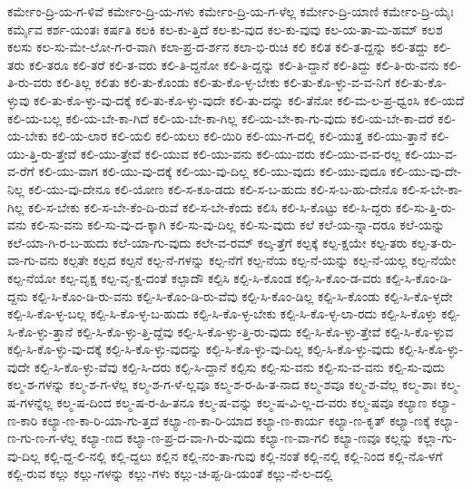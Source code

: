 {ಕರ್ಮೇಂ-ದ್ರಿ-ಯ-ಗ-ಳಿವೆ
ಕರ್ಮೇಂ-ದ್ರಿ-ಯ-ಗಳು
ಕರ್ಮೇಂ-ದ್ರಿ-ಯ-ಗ-ಳೆಲ್ಲ
ಕರ್ಮೇಂ-ದ್ರಿ-ಯಾಣಿ
ಕರ್ಮೇಂ-ದ್ರಿ-ಯೈಃ
ಕರ್ಮೈವ
ಕರ್ಶ-ಯಂತಃ
ಕರ್ಷತಿ
ಕಲಕಿ
ಕಲ-ಕು-ತ್ತಿದೆ
ಕಲ-ಕು-ವುದ
ಕಲ-ಕು-ವುವು
ಕಲ-ಯ-ತಾ-ಮ-ಹಮ್
ಕಲಶ
ಕಲಸು
ಕಲ-ಸು-ಮೇ-ಲೋ-ಗ-ರ-ವಾಗಿ
ಕಲಾ-ಪ್ರ-ದ-ರ್ಶನ
ಕಲಾ-ಭಿ-ರುಚಿ
ಕಲಿ
ಕಲಿತ
ಕಲಿ-ತ-ದ್ದನ್ನು
ಕಲಿ-ತದ್ದು
ಕಲಿ-ತರು
ಕಲಿ-ತರೂ
ಕಲಿ-ತರೆ
ಕಲಿ-ತ-ವರು
ಕಲಿ-ತಿ-ದ್ದನೋ
ಕಲಿ-ತಿ-ದ್ದನ್ನು
ಕಲಿ-ತಿ-ದ್ದಾನೆ
ಕಲಿ-ತಿದ್ದು
ಕಲಿ-ತಿ-ರು-ವನು
ಕಲಿ-ತಿ-ರು-ವರು
ಕಲಿ-ತಿಲ್ಲ
ಕಲಿತು
ಕಲಿ-ತು-ಕೊಂಡು
ಕಲಿ-ತು-ಕೊ-ಳ್ಳ-ಬೇಕು
ಕಲಿ-ತು-ಕೊ-ಳ್ಳು-ವ-ವ-ನಿಗೆ
ಕಲಿ-ತು-ಕೊ-ಳ್ಳುವು
ಕಲಿ-ತು-ಕೊ-ಳ್ಳು-ವು-ದಕ್ಕೆ
ಕಲಿ-ತು-ಕೊ-ಳ್ಳು-ವುದೇ
ಕಲಿ-ತು-ದನ್ನು
ಕಲಿ-ತೆನೋ
ಕಲಿ-ಮ-ಲ-ಪ್ರ-ಧ್ವಂಸಿ
ಕಲಿ-ಯದೆ
ಕಲಿ-ಯ-ಬಲ್ಲ
ಕಲಿ-ಯ-ಬೇ-ಕಾ-ಗಿದೆ
ಕಲಿ-ಯ-ಬೇ-ಕಾ-ಗಿಲ್ಲ
ಕಲಿ-ಯ-ಬೇ-ಕಾ-ಗು-ವುದು
ಕಲಿ-ಯ-ಬೇ-ಕಾ-ದರೆ
ಕಲಿ-ಯ-ಬೇಕು
ಕಲಿ-ಯ-ಲಾರ
ಕಲಿ-ಯಲಿ
ಕಲಿ-ಯಲು
ಕಲಿ-ಯಿರಿ
ಕಲಿ-ಯು-ಗ-ದಲ್ಲಿ
ಕಲಿ-ಯುತ್ತ
ಕಲಿ-ಯು-ತ್ತಾನೆ
ಕಲಿ-ಯು-ತ್ತಿ-ರು-ತ್ತೇವೆ
ಕಲಿ-ಯು-ತ್ತೇವೆ
ಕಲಿ-ಯುವ
ಕಲಿ-ಯು-ವನು
ಕಲಿ-ಯು-ವರು
ಕಲಿ-ಯು-ವ-ವ-ರಲ್ಲ
ಕಲಿ-ಯು-ವ-ವ-ರೆಗೆ
ಕಲಿ-ಯು-ವಾಗ
ಕಲಿ-ಯು-ವು-ದಕ್ಕೆ
ಕಲಿ-ಯು-ವು-ದಿಲ್ಲ
ಕಲಿ-ಯು-ವುದು
ಕಲಿ-ಯು-ವುದೂ
ಕಲಿ-ಯು-ವು-ದೇ-ನಿಲ್ಲ
ಕಲಿ-ಯು-ವು-ದೇನೂ
ಕಲಿ-ಯೋಣ
ಕಲಿ-ಸ-ಕೂ-ಡದು
ಕಲಿ-ಸ-ಬ-ಹುದು
ಕಲಿ-ಸ-ಬ-ಹು-ದೇನೊ
ಕಲಿ-ಸ-ಬೇ-ಕಾ-ಗಿಲ್ಲ
ಕಲಿ-ಸ-ಬೇಕು
ಕಲಿ-ಸ-ಬೇ-ಕೆಂ-ದಿ-ರುವೆ
ಕಲಿ-ಸ-ಬೇ-ಕೆಂದು
ಕಲಿಸಿ
ಕಲಿ-ಸಿ-ಕೊಟ್ಟು
ಕಲಿ-ಸಿ-ದ್ದರು
ಕಲಿ-ಸು-ತ್ತಿ-ರು-ವನು
ಕಲಿ-ಸು-ವನು
ಕಲಿ-ಸು-ವು-ದ-ಕ್ಕಾಗಿ
ಕಲಿ-ಸು-ವು-ದಿಲ್ಲ
ಕಲಿ-ಸು-ವುದು
ಕಲೆ
ಕಲೆ-ಯ-ನ್ನಾ-ದರೂ
ಕಲೆ-ಯನ್ನು
ಕಲೆ-ಯಾ-ಗಿ-ರ-ಬ-ಹುದು
ಕಲೆ-ಯಾ-ಗು-ವುದು
ಕಲೇ-ವ-ರಮ್
ಕಲ್ಕ-ತ್ತೆಗೆ
ಕಲ್ಪಕ್ಕೆ
ಕಲ್ಪ-ಕ್ಷಯೇ
ಕಲ್ಪ-ತರು
ಕಲ್ಪ-ತ-ರು-ವಾ-ಗು-ವನು
ಕಲ್ಪತೇ
ಕಲ್ಪದ
ಕಲ್ಪನೆ
ಕಲ್ಪ-ನೆ-ಗಳನ್ನು
ಕಲ್ಪ-ನೆಗೆ
ಕಲ್ಪ-ನೆಯ
ಕಲ್ಪ-ನೆ-ಯನ್ನು
ಕಲ್ಪ-ನೆ-ಯಲ್ಲ
ಕಲ್ಪ-ನೆಯೇ
ಕಲ್ಪ-ನೆಯೋ
ಕಲ್ಪ-ವೃಕ್ಷ
ಕಲ್ಪ-ವೃ-ಕ್ಷ-ದಂತೆ
ಕಲ್ಪಾದೌ
ಕಲ್ಪಿಸಿ
ಕಲ್ಪಿ-ಸಿ-ಕೊಂಡ
ಕಲ್ಪಿ-ಸಿ-ಕೊಂ-ಡ-ವರು
ಕಲ್ಪಿ-ಸಿ-ಕೊಂ-ಡಿ-ದ್ದನು
ಕಲ್ಪಿ-ಸಿ-ಕೊಂ-ಡಿ-ರು-ವನು
ಕಲ್ಪಿ-ಸಿ-ಕೊಂ-ಡಿ-ರು-ವೆವು
ಕಲ್ಪಿ-ಸಿ-ಕೊಂ-ಡಿಲ್ಲ
ಕಲ್ಪಿ-ಸಿ-ಕೊಂಡು
ಕಲ್ಪಿ-ಸಿ-ಕೊ-ಳ್ಳದೇ
ಕಲ್ಪಿ-ಸಿ-ಕೊ-ಳ್ಳ-ಬಲ್ಲ
ಕಲ್ಪಿ-ಸಿ-ಕೊ-ಳ್ಳ-ಬ-ಹುದು
ಕಲ್ಪಿ-ಸಿ-ಕೊ-ಳ್ಳ-ಬೇಕು
ಕಲ್ಪಿ-ಸಿ-ಕೊ-ಳ್ಳ-ಲಾ-ರದು
ಕಲ್ಪಿ-ಸಿ-ಕೊಳ್ಳು
ಕಲ್ಪಿ-ಸಿ-ಕೊ-ಳ್ಳು-ತ್ತಾನೆ
ಕಲ್ಪಿ-ಸಿ-ಕೊ-ಳ್ಳು-ತ್ತಿ-ದ್ದೆವು
ಕಲ್ಪಿ-ಸಿ-ಕೊ-ಳ್ಳು-ತ್ತಿ-ರು-ವುದು
ಕಲ್ಪಿ-ಸಿ-ಕೊ-ಳ್ಳು-ತ್ತೇವೆ
ಕಲ್ಪಿ-ಸಿ-ಕೊ-ಳ್ಳುವ
ಕಲ್ಪಿ-ಸಿ-ಕೊ-ಳ್ಳು-ವು-ದಕ್ಕೆ
ಕಲ್ಪಿ-ಸಿ-ಕೊ-ಳ್ಳು-ವುದನ್ನು
ಕಲ್ಪಿ-ಸಿ-ಕೊ-ಳ್ಳು-ವು-ದಿಲ್ಲ
ಕಲ್ಪಿ-ಸಿ-ಕೊ-ಳ್ಳು-ವುದು
ಕಲ್ಪಿ-ಸಿ-ಕೊ-ಳ್ಳು-ವುದೇ
ಕಲ್ಪಿ-ಸಿ-ಕೊ-ಳ್ಳು-ವೆವು
ಕಲ್ಪಿ-ಸಿ-ದರು
ಕಲ್ಪಿ-ಸಿ-ದ್ದಾನೆ
ಕಲ್ಪಿಸು
ಕಲ್ಪಿ-ಸು-ವನು
ಕಲ್ಪಿ-ಸು-ವ-ವನು
ಕಲ್ಪಿ-ಸು-ವುದು
ಕಲ್ಮ-ಶ-ಗಳನ್ನು
ಕಲ್ಮ-ಶ-ಗ-ಳೆಲ್ಲ
ಕಲ್ಮ-ಶ-ಗ-ಳೆ-ಲ್ಲವೂ
ಕಲ್ಮ-ಶ-ರ-ಹಿ-ತ-ನಾದ
ಕಲ್ಮ-ಶವೂ
ಕಲ್ಮ-ಶ-ವೆಲ್ಲ
ಕಲ್ಮ-ಶಾಃ
ಕಲ್ಮ-ಷ-ಗಳನ್ನೆಲ್ಲ
ಕಲ್ಮ-ಷ-ದಿಂದ
ಕಲ್ಮ-ಷ-ರ-ಹಿ-ತನೂ
ಕಲ್ಮ-ಷ-ವನ್ನು
ಕಲ್ಮ-ಷ-ವಿ-ಲ್ಲ-ದ-ವರು
ಕಲ್ಮ-ಷವೂ
ಕಲ್ಯಾಣ
ಕಲ್ಯಾ-ಣ-ಕಾರಿ
ಕಲ್ಯಾ-ಣ-ಕಾ-ರಿ-ಯಾ-ಗು-ತ್ತದೆ
ಕಲ್ಯಾ-ಣ-ಕಾ-ರಿ-ಯಾದ
ಕಲ್ಯಾ-ಣ-ಕಾರ್ಯ
ಕಲ್ಯಾ-ಣ-ಕೃತ್
ಕಲ್ಯಾ-ಣಕ್ಕೆ
ಕಲ್ಯಾ-ಣ-ಗು-ಣ-ಗ-ಳೆಲ್ಲ
ಕಲ್ಯಾ-ಣದ
ಕಲ್ಯಾ-ಣ-ಪ್ರ-ದ-ವಾ-ಗಿ-ರು-ವುದು
ಕಲ್ಯಾ-ಣ-ವಾ-ಗಲಿ
ಕಲ್ಯಾ-ಣವೂ
ಕಲ್ಲನ್ನು
ಕಲ್ಲಾ-ಗು-ವು-ದಿಲ್ಲ
ಕಲ್ಲಿ-ದ್ದ-ಲಿ-ನಲ್ಲಿ
ಕಲ್ಲಿ-ದ್ದಲು
ಕಲ್ಲಿನ
ಕಲ್ಲಿ-ನಂ-ತಾ-ಗುವು
ಕಲ್ಲಿ-ನಂತೆ
ಕಲ್ಲಿ-ನಲ್ಲಿ
ಕಲ್ಲಿ-ನಿಂದ
ಕಲ್ಲಿ-ನೊ-ಳಗೆ
ಕಲ್ಲಿ-ರುವ
ಕಲ್ಲು
ಕಲ್ಲು-ಗಳನ್ನು
ಕಲ್ಲು-ಗಳು
ಕಲ್ಲು-ಚ-ಪ್ಪ-ಡಿ-ಯಂತೆ
ಕಲ್ಲು-ನೆ-ಲ-ದಲ್ಲಿ
}

